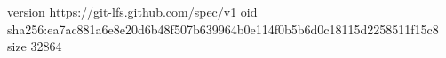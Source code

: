 version https://git-lfs.github.com/spec/v1
oid sha256:ea7ac881a6e8e20d6b48f507b639964b0e114f0b5b6d0c18115d2258511f15c8
size 32864

